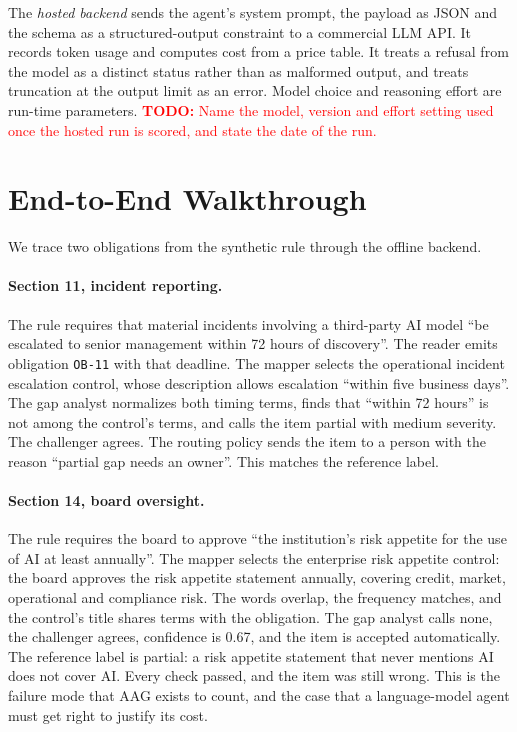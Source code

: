 \documentclass[sigconf,review,anonymous]{acmart}
\newcommand{\todo}[1]{\textcolor{red}{\textbf{TODO:} #1}}
\newcommand{\gapnone}{\textsf{none}}
\newcommand{\gappartial}{\textsf{partial}}
\begin{document}
The \emph{hosted backend} sends the agent's system prompt, the payload as
JSON and the schema as a structured-output constraint to a commercial LLM
API. It records token usage and computes cost from a price table. It treats
a refusal from the model as a distinct status rather than as malformed
output, and treats truncation at the output limit as an error. Model choice
and reasoning effort are run-time parameters.
\todo{Name the model, version and effort setting used once the hosted run is
scored, and state the date of the run.}

\section{End-to-End Walkthrough}
\label{sec:walkthrough}

We trace two obligations from the synthetic rule through the offline
backend.

\paragraph{Section 11, incident reporting.}
The rule requires that material incidents involving a third-party AI model
``be escalated to senior management within 72 hours of discovery''. The
reader emits obligation \texttt{OB-11} with that deadline. The mapper
selects the operational incident escalation control, whose description
allows escalation ``within five business days''. The gap analyst normalizes
both timing terms, finds that ``within 72 hours'' is not among the
control's terms, and calls the item \gappartial{} with medium severity. The
challenger agrees. The routing policy sends the item to a person with the
reason ``partial gap needs an owner''. This matches the reference label.

\paragraph{Section 14, board oversight.}
The rule requires the board to approve ``the institution's risk appetite for
the use of AI at least annually''. The mapper selects the enterprise risk
appetite control: the board approves the risk appetite statement annually,
covering credit, market, operational and compliance risk. The words
overlap, the frequency matches, and the control's title shares terms with
the obligation. The gap analyst calls \gapnone{}, the challenger agrees,
confidence is 0.67, and the item is accepted automatically. The reference
label is \gappartial{}: a risk appetite statement that never mentions AI
does not cover AI. Every check passed, and the item was still wrong. This is
the failure mode that AAG exists to count, and the case that a
language-model agent must get right to justify its cost.
\end{document}
